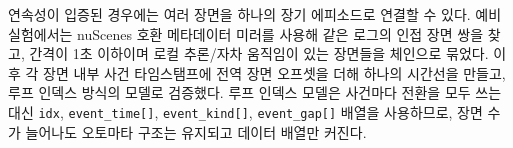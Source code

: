 연속성이 입증된 경우에는 여러 장면을 하나의 장기 에피소드로 연결할 수 있다. 예비 실험에서는 nuScenes 호환 메타데이터 미러를 사용해 같은 로그의 인접 장면 쌍을 찾고, 간격이 1초 이하이며 로컬 추론/자차 움직임이 있는 장면들을 체인으로 묶었다. 이후 각 장면 내부 사건 타임스탬프에 전역 장면 오프셋을 더해 하나의 시간선을 만들고, 루프 인덱스 방식의 \uppaal 모델로 검증했다. 루프 인덱스 모델은 사건마다 전환을 모두 쓰는 대신 \texttt{idx}, \texttt{event\_time[]}, \texttt{event\_kind[]}, \texttt{event\_gap[]} 배열을 사용하므로, 장면 수가 늘어나도 오토마타 구조는 유지되고 데이터 배열만 커진다.
